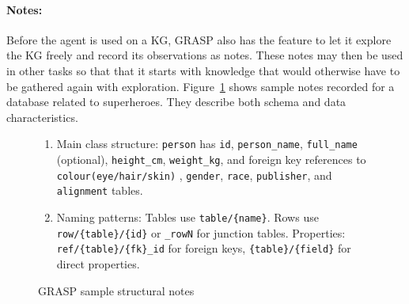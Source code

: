 
\paragraph{Notes:}
Before the agent is used on a KG, GRASP also has the feature to let it explore the KG freely and record its observations as notes. These notes may then be used in other tasks so that that it starts with knowledge that would otherwise have to be gathered again with exploration. Figure~\ref{fig:grasp-notes} shows sample notes recorded for a database related to superheroes. They describe both schema and data characteristics.

\begin{figure}[!htbp]
\small
\begin{enumerate}[leftmargin=*, itemsep=1pt]
  \item Main class structure: \texttt{person} has \texttt{id}, \texttt{person\_name}, \texttt{full\_name} (optional), \texttt{height\_cm}, \texttt{weight\_kg}, and foreign key references to \texttt{colour(eye/hair/skin)} , \texttt{gender}, \texttt{race}, \texttt{publisher}, and \texttt{alignment} tables.
  \item Naming patterns: Tables use \texttt{table/\{name\}}. Rows use \texttt{row/\{table\}/\{id\}} or \texttt{\_rowN} for junction tables. Properties: \texttt{ref/\{table\}/\{fk\}\_id} for foreign keys, \texttt{\{table\}/\{field\}} for direct properties.
\end{enumerate}
\caption{GRASP sample structural notes}
\label{fig:grasp-notes}
\end{figure}


